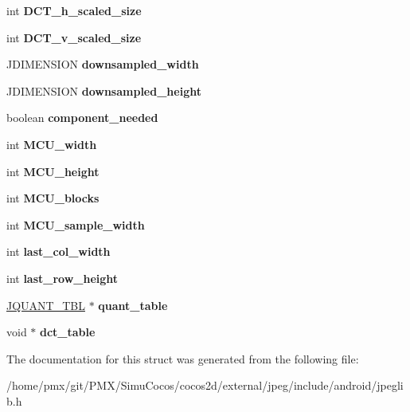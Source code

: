 \begin{DoxyCompactItemize}
int {\bfseries D\+C\+T\+\_\+h\+\_\+scaled\+\_\+size}
\item 
\mbox{\label{structjpeg__component__info_a8099359745c7887abe9158cf5655b5f3}} 
int {\bfseries D\+C\+T\+\_\+v\+\_\+scaled\+\_\+size}
\item 
\mbox{\label{structjpeg__component__info_aacbe6c10eca470c8ec331f91be8cccee}} 
J\+D\+I\+M\+E\+N\+S\+I\+ON {\bfseries downsampled\+\_\+width}
\item 
\mbox{\label{structjpeg__component__info_a019811f4bcc16fe481e0b53f659b281e}} 
J\+D\+I\+M\+E\+N\+S\+I\+ON {\bfseries downsampled\+\_\+height}
\item 
\mbox{\label{structjpeg__component__info_a8f9efa098849cd087e20d536b05d4798}} 
boolean {\bfseries component\+\_\+needed}
\item 
\mbox{\label{structjpeg__component__info_a82a5bababd81410839aefec8a61878de}} 
int {\bfseries M\+C\+U\+\_\+width}
\item 
\mbox{\label{structjpeg__component__info_a09baec129e44114d46d5b19dc98b0105}} 
int {\bfseries M\+C\+U\+\_\+height}
\item 
\mbox{\label{structjpeg__component__info_ad9b901306395808c7eb338148e30c2cd}} 
int {\bfseries M\+C\+U\+\_\+blocks}
\item 
\mbox{\label{structjpeg__component__info_aca7e52dcd78bb2fe51104e2add9dade5}} 
int {\bfseries M\+C\+U\+\_\+sample\+\_\+width}
\item 
\mbox{\label{structjpeg__component__info_a440612272e3e9eac0a240fd34cde5bbe}} 
int {\bfseries last\+\_\+col\+\_\+width}
\item 
\mbox{\label{structjpeg__component__info_a7d0738ae3647a019722410a2d718f3d3}} 
int {\bfseries last\+\_\+row\+\_\+height}
\item 
\mbox{\label{structjpeg__component__info_af3e9147532678e82ed4a54ea82f4efd5}} 
\hyperlink{structJQUANT__TBL}{J\+Q\+U\+A\+N\+T\+\_\+\+T\+BL} $\ast$ {\bfseries quant\+\_\+table}
\item 
\mbox{\label{structjpeg__component__info_af7591eef1bac561bd2912297e3f4e0ef}} 
void $\ast$ {\bfseries dct\+\_\+table}
\end{DoxyCompactItemize}


The documentation for this struct was generated from the following file\+:\begin{DoxyCompactItemize}
\item 
/home/pmx/git/\+P\+M\+X/\+Simu\+Cocos/cocos2d/external/jpeg/include/android/jpeglib.\+h\end{DoxyCompactItemize}
